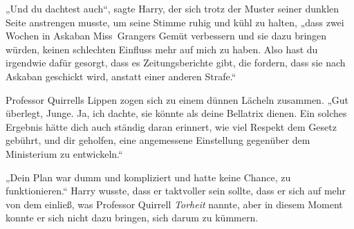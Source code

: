 „Und du dachtest auch“, sagte Harry, der sich trotz der Muster seiner dunklen Seite anstrengen musste, um seine Stimme ruhig und kühl zu halten, „dass zwei Wochen in Askaban Miss~Grangers Gemüt verbessern und sie dazu bringen würden, keinen schlechten Einfluss mehr auf mich zu haben. Also hast du irgendwie dafür gesorgt, dass es Zeitungsberichte gibt, die fordern, dass sie nach Askaban geschickt wird, anstatt einer anderen Strafe.“

Professor Quirrells Lippen zogen sich zu einem dünnen Lächeln zusammen.
„Gut überlegt, Junge. Ja, ich dachte, sie könnte als deine Bellatrix dienen. Ein solches Ergebnis hätte dich auch ständig daran erinnert, wie viel Respekt dem Gesetz gebührt, und dir geholfen, eine angemessene Einstellung gegenüber dem Ministerium zu entwickeln.“

„Dein Plan war dumm und kompliziert und hatte keine Chance, zu funktionieren.“
Harry wusste, dass er taktvoller sein sollte, dass er sich auf mehr von dem einließ, was Professor Quirrell \emph{Torheit} nannte, aber in diesem Moment konnte er sich nicht dazu bringen, sich darum zu kümmern.

